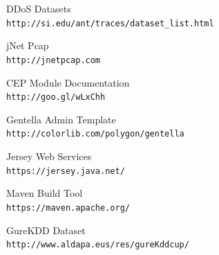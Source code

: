 \documentclass[conference]{sig-alternate-05-2015}
\begin{document}
\begin{thebibliography}{9}
DDoS Datasets
\\\texttt{http://si.edu/ant/traces/dataset\_list.html}

jNet Pcap
\\\texttt{http://jnetpcap.com}

CEP Module Documentation
\\\texttt{http://goo.gl/wLxChh}

Gentella Admin Template
\\\texttt{http://colorlib.com/polygon/gentella}

Jersey Web Services
\\\texttt{https://jersey.java.net/}

Maven Build Tool
\\\texttt{https://maven.apache.org/}

GureKDD Dataset
\\\texttt{http://www.aldapa.eus/res/gureKddcup/}



\end{thebibliography}
\end{document}
